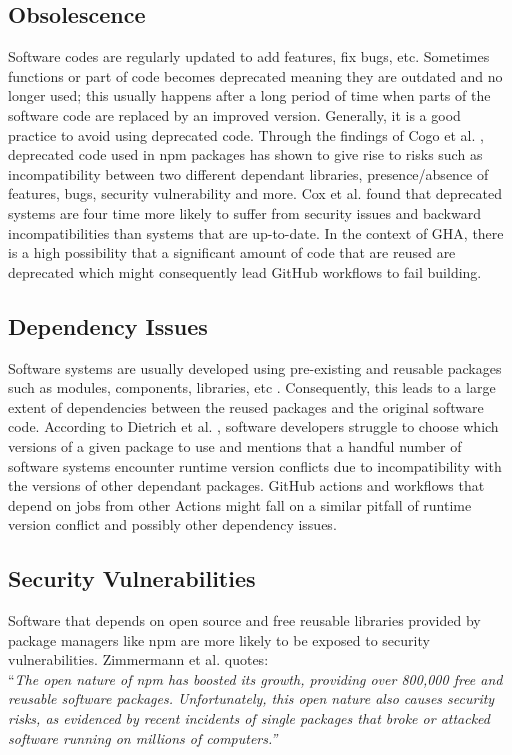 \documentclass[conference]{IEEEtran}
\begin{document}
\subsection{Obsolescence}

Software codes are regularly updated to add features, fix bugs, etc. Sometimes functions or part of code becomes deprecated meaning they are outdated and no longer used; this usually happens after a long period of time when parts of the software code are replaced by an improved version. Generally, it is a good practice to avoid using deprecated code. Through the findings of Cogo et al. \cite{b6}, deprecated code used in npm packages has shown to give rise to risks such as incompatibility between two different dependant libraries, presence/absence of features, bugs, security vulnerability and more. Cox et al. \cite{b17} found that deprecated systems are four time more likely to suffer from security issues and backward incompatibilities than systems that are up-to-date. In the context of GHA, there is a high possibility that a significant amount of code that are reused are deprecated which might consequently lead GitHub workflows to fail building.
\subsection{Dependency Issues}
Software systems are usually developed using pre-existing and reusable packages such as modules, components, libraries, etc \cite{b7}\cite{b8}. Consequently, this leads to a large extent of dependencies between the reused packages and the original software code. According to Dietrich et al. \cite{b10}, software developers struggle to choose which versions of a given package to use and mentions that a handful number of software systems encounter runtime version conflicts due to incompatibility with the versions of other dependant packages. GitHub actions and workflows that depend on jobs from other Actions might fall on a similar pitfall of runtime version conflict and possibly other dependency issues.
\subsection{Security Vulnerabilities}
Software that depends on open source and free reusable libraries provided by package managers like npm are more likely to be exposed to security vulnerabilities. Zimmermann et al. \cite{b12} quotes: \\

“\textit{The open nature of npm has boosted its growth, providing over 800,000 free and reusable software packages. Unfortunately, this open nature also causes security risks, as evidenced by recent incidents of single packages that broke or attacked software running on millions of computers.”} \\
\end{document}
